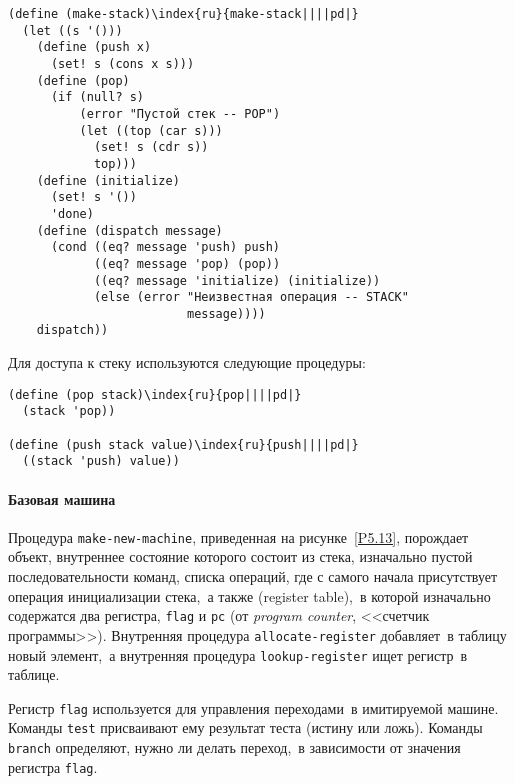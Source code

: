 \begin{Verbatim}[fontsize=\small]
(define (make-stack)\index{ru}{make-stack||||pd|}
  (let ((s '()))
    (define (push x)
      (set! s (cons x s)))
    (define (pop)
      (if (null? s)
          (error "Пустой стек -- POP")
          (let ((top (car s)))
            (set! s (cdr s))
            top)))
    (define (initialize)
      (set! s '())
      'done)
    (define (dispatch message)
      (cond ((eq? message 'push) push)
            ((eq? message 'pop) (pop))
            ((eq? message 'initialize) (initialize))
            (else (error "Неизвестная операция -- STACK"
                         message))))
    dispatch))
\end{Verbatim}
Для доступа к стеку используются следующие процедуры:

\begin{Verbatim}[fontsize=\small]
(define (pop stack)\index{ru}{pop||||pd|}
  (stack 'pop))

(define (push stack value)\index{ru}{push||||pd|}
  ((stack 'push) value))
\end{Verbatim}

\paragraph{Базовая машина}


Процедура {\tt make-new-machine}, приведенная на
рисунке~\ref{P5.13}, порождает объект, внутреннее
состояние которого состоит из стека, изначально пустой
последовательности команд, списка операций, где с самого начала
присутствует операция инициализации стека,~а также 
 (register table),~в которой
изначально содержатся два регистра, {\tt flag} 
и {\tt pc} 
(от {\em program counter}, 
<<счетчик программы>>).  Внутренняя процедура {\tt allocate-register}
добавляет~в таблицу новый элемент,~а внутренняя процедура
{\tt lookup-register} ищет регистр~в таблице.

Регистр {\tt flag} используется для управления
переходами~в имитируемой машине.  Команды {\tt test}
присваивают ему результат теста (истину или ложь).  Команды
{\tt branch} определяют, нужно ли делать переход,~в зависимости от
значения регистра {\tt flag}.

